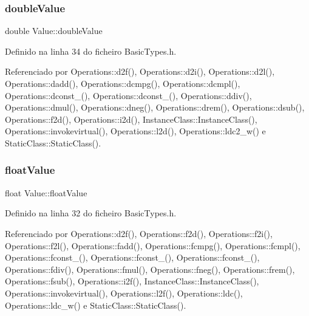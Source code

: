 \mbox{\label{structValue_a645fe257d42cf5076170f86f9f1ab65c}} 
\subsubsection{\texorpdfstring{double\+Value}{doubleValue}}
{\footnotesize\ttfamily double Value\+::double\+Value}



Definido na linha 34 do ficheiro Basic\+Types.\+h.



Referenciado por Operations\+::d2f(), Operations\+::d2i(), Operations\+::d2l(), Operations\+::dadd(), Operations\+::dcmpg(), Operations\+::dcmpl(), Operations\+::dconst\+\_(), Operations\+::dconst\+\_(), Operations\+::ddiv(), Operations\+::dmul(), Operations\+::dneg(), Operations\+::drem(), Operations\+::dsub(), Operations\+::f2d(), Operations\+::i2d(), Instance\+Class\+::\+Instance\+Class(), Operations\+::invokevirtual(), Operations\+::l2d(), Operations\+::ldc2\+\_\+w() e Static\+Class\+::\+Static\+Class().

\mbox{\label{structValue_a45b6c1f608872f5420b3da208a7c1ef0}} 
\subsubsection{\texorpdfstring{float\+Value}{floatValue}}
{\footnotesize\ttfamily float Value\+::float\+Value}



Definido na linha 32 do ficheiro Basic\+Types.\+h.



Referenciado por Operations\+::d2f(), Operations\+::f2d(), Operations\+::f2i(), Operations\+::f2l(), Operations\+::fadd(), Operations\+::fcmpg(), Operations\+::fcmpl(), Operations\+::fconst\+\_(), Operations\+::fconst\+\_(), Operations\+::fconst\+\_(), Operations\+::fdiv(), Operations\+::fmul(), Operations\+::fneg(), Operations\+::frem(), Operations\+::fsub(), Operations\+::i2f(), Instance\+Class\+::\+Instance\+Class(), Operations\+::invokevirtual(), Operations\+::l2f(), Operations\+::ldc(), Operations\+::ldc\+\_\+w() e Static\+Class\+::\+Static\+Class().

\mbox{\label{structValue_a0a2a9c06ef5a473232b4349395fd68dd}} 
